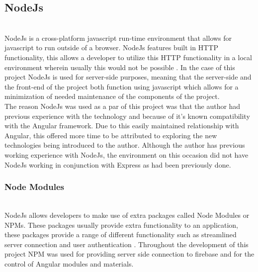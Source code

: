 \subsection{NodeJs} \\
NodeJs is a cross-platform javascript run-time environment that allows for javascript to run outside of a browser. NodeJs features built in HTTP functionality, this allows a developer to utilize this HTTP functionality in a local environment wherein usually this would not be possible \cite{nodejs}. In the case of this project NodeJs is used for server-side purposes, meaning that the server-side and the front-end of the project both function using javascript which allows for a minimization of needed maintenance of the components of the project. \\ 
The reason NodeJs was used as a par of this project was that the author had previous experience with the technology and because of it's known compatibility with the Angular framework. Due to this easily maintained relationship with Angular, this offered more time to be attributed to exploring the new technologies being introduced to the author. Although the author has previous working experience with NodeJs, the environment on this occasion did not have NodeJs working in conjunction with Express as had been previously done. \\

\subsubsection{Node Modules} \\ 
NodeJs allows developers to make use of extra packages called Node Modules or NPMs. These packages usually provide extra functionality to an application, these packages provide a range of different functionality such as streamlined server connection and user authentication \cite{npm}. Throughout the development of this project NPM was used for providing server side connection to firebase and for the control of Angular modules and materials.

